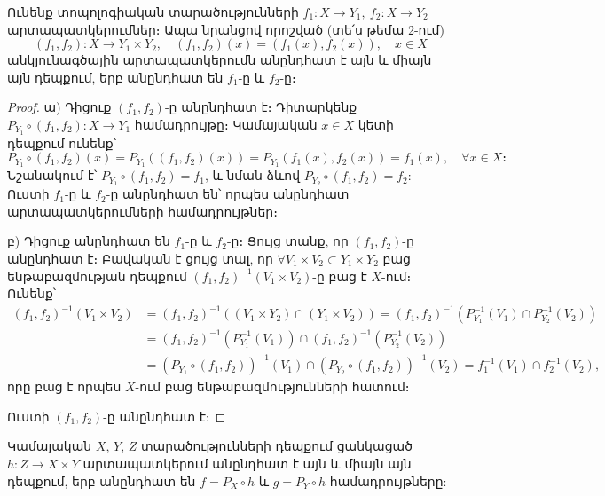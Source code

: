 \documentclass[./main.tex]{subfiles}
\begin{document}
\begin{theorem}\label{ch13thm3}
Ունենք տոպոլոգիական տարածությունների $f_1:X\rightarrow Y_1,\ {f_2:X\rightarrow Y_2}$ արտապատկերումներ։ Ապա նրանցով որոշված (տե՛ս թեմա 2-ում)
\densequation
\[ (f_1,f_2):X\rightarrow Y_1\times Y_2,\quad (f_1,f_2)(x)=(f_1(x),f_2(x)), \quad x\in X \]
անկյունագծային արտապատկերումն անընդհատ է այն և միայն այն դեպքում, երբ անընդհատ են $f_1$-ը և $f_2$-ը։
\end{theorem}
\begin{proof} 
ա) Դիցուք $(f_1,f_2)$-ը անընդհատ է։ Դիտարկենք $P_{Y_1}\circ (f_1,f_2):{X\rightarrow Y_1}$ համադրույթը։ Կամայական $x \in X$ կետի դեպքում ունենք՝ 
    \[ P_{Y_1}\circ (f_1,f_2)(x)=P_{Y_1}((f_1,f_2)(x))=P_{Y_1}(f_1(x),f_2(x))=f_1(x),\quad \forall x\in X։\] 
Նշանակում է՝ $P_{Y_1}\circ (f_1,f_2)=f_1$, և նման ձևով $P_{Y_2}\circ(f_1,f_2)=f_2$: Ուստի $f_1$-ը և $f_2$-ը անընդհատ են՝ որպես անընդհատ արտապատկերումների համադրույթներ։
\par բ) Դիցուք անընդհատ են $f_1$-ը և $f_2$-ը։ Ցույց տանք, որ $(f_1,f_2)$-ը անընդհատ է։ Բավական է ցույց տալ, որ $\forall V_1\times V_2\subset Y_1\times Y_2$ բաց ենթաբազմության դեպքում $(f_1,f_2)^{-1} (V_1\times V_2)$-ը բաց է $X$-ում։ Ունենք՝
    \begin{equation*}
    \begin{aligned}
    (f_1,f_2)^{-1} (V_1\times V_2)&=(f_1,f_2)^{-1} ((V_1\times Y_2)\cap (Y_1\times V_2))=(f_1,f_2)^{-1} (P_{Y_1}^{-1} (V_1)\cap P_{Y_2}^{-1}(V_2))\\ &=(f_1,f_2)^{-1}(P_{Y_1}^{-1} (V_1))\cap(f_1,f_2)^{-1}(P_{Y_2}^{-1} (V_2))\\&=(P_{Y_1}\circ(f_1,f_2))^{-1}(V_1)\cap (P_{Y_2}\circ(f_1,f_2))^{-1} (V_2)=f_1^{-1} (V_1)\cap f_2^{-1} (V_2),
    \end{aligned}
    \end{equation*}
որը բաց է որպես $X$-ում բաց ենթաբազմությունների հատում։
\par Ուստի $(f_1,f_2)$-ը անընդհատ է:
\end{proof}


\begin{theorem}\label{ch13thm4} 
    Կամայական $X$, $Y$, $Z$ տարածությունների դեպքում ցանկացած \linebreak ${h: Z \to X \times Y}$ արտապատկերում անընդհատ է այն և միայն այն դեպքում, երբ անընդհատ են $f = P_X \circ h$ և $g = P_Y \circ h$ համադրույթները:
\end{theorem}
\end{document}
